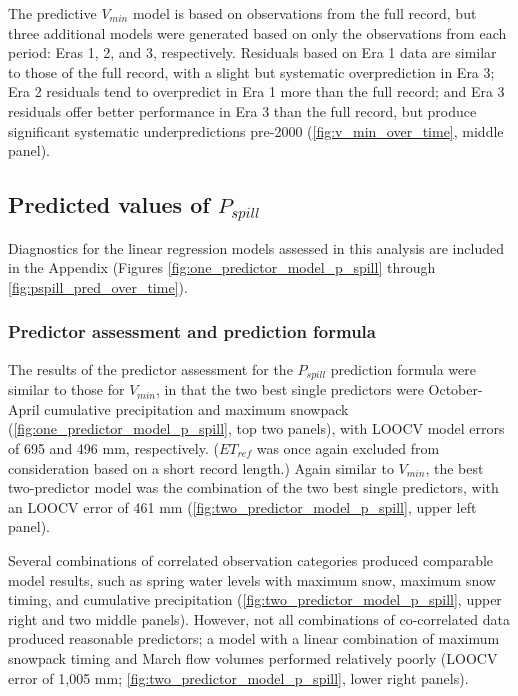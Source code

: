 \documentclass[hess, manuscript]{copernicus}
\begin{document}
The predictive \(V_{min}\) model is based on observations from the full
record, but three additional models were generated based on only the
observations from each period: Eras 1, 2, and 3, respectively. Residuals
based on Era 1 data are similar to those of the full record, with a
slight but systematic overprediction in Era 3; Era 2 residuals tend to
overpredict in Era 1 more than the full record; and Era 3 residuals
offer better performance in Era 3 than the full record, but produce
significant systematic underpredictions pre-2000
(\autoref{fig:v_min_over_time}, middle panel).

\subsection{\texorpdfstring{Predicted values of
\(P_{spill}\)}{Predicted values of P\_\{spill\}}}

Diagnostics for the linear regression models assessed in this analysis
are included in the Appendix (Figures
\ref{fig:one_predictor_model_p_spill} through
\ref{fig:pspill_pred_over_time}).

\subsubsection{Predictor assessment and prediction formula}

The results of the predictor assessment for the \(P_{spill}\) prediction
formula were similar to those for \(V_{min}\), in that the two best
single predictors were October-April cumulative precipitation and
maximum snowpack (\autoref{fig:one_predictor_model_p_spill}, top two
panels), with LOOCV model errors of 695 and 496 mm, respectively.
(\(ET_{ref}\) was once again excluded from consideration based on a
short record length.) Again similar to \(V_{min}\), the best
two-predictor model was the combination of the two best single
predictors, with an LOOCV error of 461 mm
(\autoref{fig:two_predictor_model_p_spill}, upper left panel).

Several combinations of correlated observation categories produced
comparable model results, such as spring water levels with maximum snow,
maximum snow timing, and cumulative precipitation
(\autoref{fig:two_predictor_model_p_spill}, upper right and two middle
panels). However, not all combinations of co-correlated data produced
reasonable predictors; a model with a linear combination of maximum
snowpack timing and March flow volumes performed relatively poorly
(LOOCV error of 1,005 mm; \autoref{fig:two_predictor_model_p_spill},
lower right panels).
\end{document}
